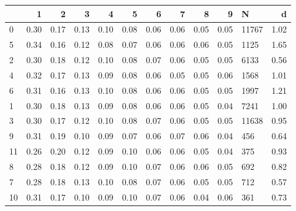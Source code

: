 \begin{tabular}{lrrrrrrrrrlr}
\toprule
{} &    1 &    2 &    3 &    4 &    5 &    6 &    7 &    8 &    9 &      N &    d \\
\midrule
0  & 0.30 & 0.17 & 0.13 & 0.10 & 0.08 & 0.06 & 0.06 & 0.05 & 0.05 &  11767 & 1.02 \\
5  & 0.34 & 0.16 & 0.12 & 0.08 & 0.07 & 0.06 & 0.06 & 0.06 & 0.05 &   1125 & 1.65 \\
2  & 0.30 & 0.18 & 0.12 & 0.10 & 0.08 & 0.07 & 0.06 & 0.05 & 0.05 &   6133 & 0.56 \\
4  & 0.32 & 0.17 & 0.13 & 0.09 & 0.08 & 0.06 & 0.05 & 0.05 & 0.06 &   1568 & 1.01 \\
6  & 0.31 & 0.16 & 0.13 & 0.10 & 0.08 & 0.06 & 0.06 & 0.05 & 0.05 &   1997 & 1.21 \\
1  & 0.30 & 0.18 & 0.13 & 0.09 & 0.08 & 0.06 & 0.06 & 0.05 & 0.04 &   7241 & 1.00 \\
3  & 0.30 & 0.17 & 0.12 & 0.10 & 0.08 & 0.07 & 0.06 & 0.05 & 0.05 &  11638 & 0.95 \\
9  & 0.31 & 0.19 & 0.10 & 0.09 & 0.07 & 0.06 & 0.07 & 0.06 & 0.04 &    456 & 0.64 \\
11 & 0.26 & 0.20 & 0.12 & 0.09 & 0.10 & 0.06 & 0.06 & 0.05 & 0.04 &    375 & 0.93 \\
8  & 0.28 & 0.18 & 0.12 & 0.09 & 0.10 & 0.07 & 0.06 & 0.06 & 0.05 &    692 & 0.82 \\
7  & 0.28 & 0.18 & 0.13 & 0.10 & 0.08 & 0.07 & 0.06 & 0.05 & 0.05 &    712 & 0.57 \\
10 & 0.31 & 0.17 & 0.10 & 0.09 & 0.10 & 0.07 & 0.06 & 0.04 & 0.06 &    361 & 0.73 \\
\bottomrule
\end{tabular}
